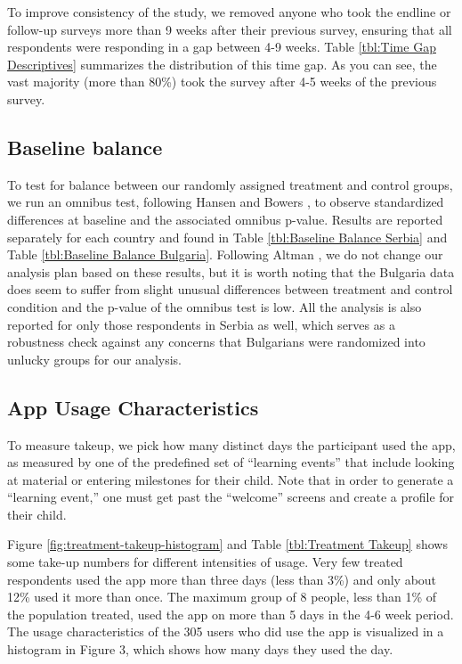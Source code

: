 \documentclass{article}
\begin{document}
To improve consistency of the study, we removed anyone who took the endline or follow-up surveys more than 9 weeks after their previous survey, ensuring that all respondents were responding in a gap between 4-9 weeks. Table \ref{tbl:Time Gap Descriptives} summarizes the distribution of this time gap. As you can see, the vast majority (more than 80\%) took the survey after 4-5 weeks of the previous survey.



\subsection{Baseline balance}


To test for balance between our randomly assigned treatment and control groups, we run an omnibus test, following Hansen and Bowers \parencite*{Hansen2008}, to observe standardized differences at baseline and the associated omnibus p-value. Results are reported separately for each country and found in Table \ref{tbl:Baseline Balance Serbia} and Table \ref{tbl:Baseline Balance Bulgaria}. Following Altman \parencite*{Altman2014}, we do not change our analysis plan based on these results, but it is worth noting that the Bulgaria data does seem to suffer from slight unusual differences between treatment and control condition and the p-value of the omnibus test is low. All the analysis is also reported for only those respondents in Serbia as well, which serves as a robustness check against any concerns that Bulgarians were randomized into unlucky groups for our analysis.




\subsection*{App Usage Characteristics}


To measure takeup, we pick how many distinct days the participant used the app, as measured by one of the predefined set of ``learning events'' that include looking at material or entering milestones for their child. Note that in order to generate a ``learning event,'' one must get past the ``welcome'' screens and create a profile for their child.

Figure \ref{fig:treatment-takeup-histogram} and Table \ref{tbl:Treatment Takeup} shows some take-up numbers for different intensities of usage. Very few treated respondents used the app more than three days (less than 3\%) and only about 12\% used it more than once. The maximum group of 8 people, less than 1\% of the population treated, used the app on more than 5 days in the 4-6 week period. The usage characteristics of the 305 users who did use the app is visualized in a histogram in Figure 3, which shows how many days they used the day.
\end{document}
